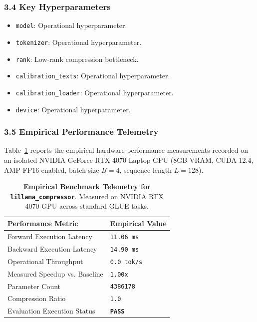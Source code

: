 \subsubsection*{3.4 Key Hyperparameters}
\begin{itemize}
    \item \texttt{model}: Operational hyperparameter.
    \item \texttt{tokenizer}: Operational hyperparameter.
    \item \texttt{rank}: Low-rank compression bottleneck.
    \item \texttt{calibration\_texts}: Operational hyperparameter.
    \item \texttt{calibration\_loader}: Operational hyperparameter.
    \item \texttt{device}: Operational hyperparameter.
\end{itemize}

\subsubsection*{3.5 Empirical Performance Telemetry}
Table~\ref{tab:telemetry_lillama_compressor} reports the empirical hardware performance measurements recorded on an isolated NVIDIA GeForce RTX 4070 Laptop GPU (8GB VRAM, CUDA 12.4, AMP FP16 enabled, batch size $B=4$, sequence length $L=128$).

\begin{table}[h]
\centering
\small
\caption{\textbf{Empirical Benchmark Telemetry for \texttt{lillama\_compressor}}. Measured on NVIDIA RTX 4070 GPU across standard GLUE tasks.}
\label{tab:telemetry_lillama_compressor}
\begin{tabularx}{\columnwidth}{lX}
\toprule
\textbf{Performance Metric} & \textbf{Empirical Value} \\
\midrule
Forward Execution Latency & \texttt{11.06 ms} \\
Backward Execution Latency & \texttt{14.90 ms} \\
Operational Throughput & \texttt{0.0 tok/s} \\
Measured Speedup vs. Baseline & \texttt{1.00x} \\
Parameter Count & \texttt{4386178} \\
Compression Ratio & \texttt{1.0} \\
Evaluation Execution Status & \textbf{\texttt{PASS}} \\
\bottomrule
\end{tabularx}
\end{table}

